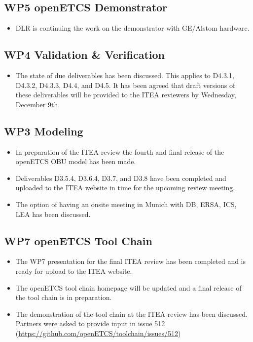 \documentclass[a4paper, 11pt]{article}
\begin{document}
\subsection{WP5 openETCS Demonstrator}
\begin{itemize}
\item DLR is continuing the work on the demonstrator with GE/Alstom hardware.
\end{itemize}

\subsection{WP4 Validation \& Verification}
\begin{itemize}
\item The state of due deliverables has been discussed. This applies to D4.3.1, D4.3.2, D4.3.3, D4.4, and D4.5. It has been agreed that draft versions of these deliverables will be provided to the ITEA reviewers by Wednesday, December 9th.
\end{itemize}

\subsection{WP3 Modeling}
\begin{itemize}
\item In preparation of the ITEA review the fourth and final release of the openETCS OBU model has been made.
\item Deliverables D3.5.4, D3.6.4, D3.7, and D3.8 have been completed and uploaded to the ITEA website in time for the upcoming review meeting.
\item The option of having an onsite meeting in Munich with DB, ERSA, ICS, LEA has been discussed.
\end{itemize}

\subsection{WP7 openETCS Tool Chain}
\begin{itemize}
\item The WP7 presentation for the final ITEA review has been completed and is ready for upload to the ITEA website.
\item The openETCS tool chain homepage will be updated and a final release of the tool chain is in preparation.
\item The demonstration of the tool chain at the ITEA review has been discussed. Partners were asked to provide input in issue 512 (\url{https://github.com/openETCS/toolchain/issues/512})
\end{itemize}
\end{document}
